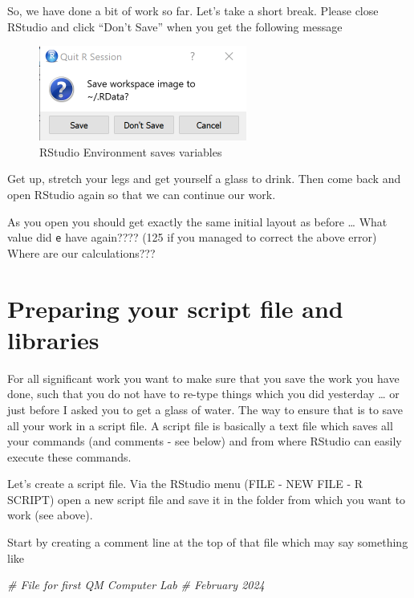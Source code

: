 \documentclass[
]{article}
\newenvironment{Shaded}{\begin{snugshade}}{\end{snugshade}}
\newcommand{\CommentTok}[1]{\textcolor[rgb]{0.56,0.35,0.01}{\textit{#1}}}
\begin{document}
So, we have done a bit of work so far. Let's take a short break. Please
close RStudio and click ``Don't Save'' when you get the following
message

\begin{figure}
\centering
\includegraphics{RStudio_SaveWorkspace.png}
\caption{RStudio Environment saves variables}
\end{figure}

Get up, stretch your legs and get yourself a glass to drink. Then come
back and open RStudio again so that we can continue our work.

As you open you should get exactly the same initial layout as before
\ldots{} What value did \texttt{e} have again???? (125 if you managed to
correct the above error) Where are our calculations???

\hypertarget{preparing-your-script-file-and-libraries}{%
\section{Preparing your script file and
libraries}\label{preparing-your-script-file-and-libraries}}

For all significant work you want to make sure that you save the work
you have done, such that you do not have to re-type things which you did
yesterday \ldots{} or just before I asked you to get a glass of water.
The way to ensure that is to save all your work in a script file. A
script file is basically a text file which saves all your commands (and
comments - see below) and from where RStudio can easily execute these
commands.

Let's create a script file. Via the RStudio menu (FILE - NEW FILE - R
SCRIPT) open a new script file and save it in the folder from which you
want to work (see above).

Start by creating a comment line at the top of that file which may say
something like

\begin{Shaded}
\begin{Highlighting}[]
\CommentTok{\# File for first QM Computer Lab}
\CommentTok{\# February 2024}
\end{Highlighting}
\end{Shaded}
\end{document}

